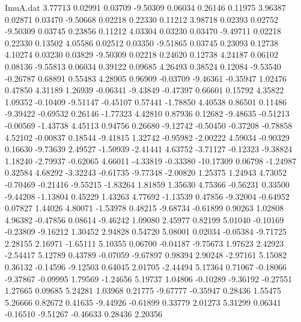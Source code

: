 \begin{filecontents}{ImuA.dat}
   3.77713    0.02991    0.03709   -9.50309    0.06034    0.26146    0.11975
   3.96387    0.02871    0.03470   -9.50668    0.02218    0.22330    0.11212
   3.98718    0.02393    0.02752   -9.50309    0.03745    0.23856    0.11212
   4.03304    0.03230    0.03470   -9.49711    0.02218    0.22330    0.13502
   4.05586    0.02512    0.03350   -9.51865    0.03745    0.23093    0.12738
   4.10274    0.03230    0.03829   -9.50309    0.02218    0.24620    0.12738
   4.24187    0.06102    0.08136   -9.55813    0.06034    0.39122    0.09685
   4.26493    0.38524    0.12084   -9.53540   -0.26787    0.68891    0.55483
   4.28905    0.96909   -0.03709   -9.46361   -0.35947    1.02476    0.47850
   4.31189    1.26939   -0.06341   -9.43849   -0.47397    0.66601    0.15792
   4.35822    1.09352   -0.10409   -9.51147   -0.45107    0.57441   -1.78850
   4.40538    0.86501    0.11486   -9.39422   -0.69532    0.26146   -1.77323
   4.42810    0.87936    0.12682   -9.48635   -0.51213   -0.00569   -1.43738
   4.45113    0.94756    0.26680   -9.12742   -0.50450   -0.37208   -0.78858
   4.52102   -0.00837    0.18544   -9.41815    1.32742   -0.95982   -2.00222
   4.59034   -0.90329    0.16630   -9.73639    2.49527   -1.50939   -2.41441
   4.63752   -3.71127   -0.12323   -9.38824    1.18240   -2.79937   -0.62065
   4.66011   -4.33819   -0.33380  -10.17309    0.06798   -1.24987    0.32584
   4.68292   -3.32243   -0.61735   -9.77348   -2.00820    1.25375    1.24943
   4.73052   -0.70469   -0.21416   -9.55215   -1.83264    1.81859    1.35630
   4.75366   -0.56231    0.33500   -9.44208   -1.13804    0.45229    1.43263
   4.77692   -1.13539    0.47856   -9.32004   -0.64952    0.07827    1.44026
   4.80071   -1.53978    0.48215   -9.68734   -0.61899    0.90263    1.02808
   4.96382   -0.47856    0.08614   -9.46242    1.09080    2.45977    0.82199
   5.01040   -0.10169   -0.23809   -9.16212    1.30452    2.94828    0.54720
   5.08001    0.02034   -0.05384   -9.71725    2.28155    2.16971   -1.65111
   5.10355    0.06700   -0.04187   -9.75673    1.97623    2.42923   -2.54417
   5.12789    0.43789   -0.07059   -9.67897    0.98394    2.90248   -2.97161
   5.15082    0.36132   -0.14596   -9.12503    0.64045    2.01705   -2.44494
   5.17364    0.71067   -0.18066   -9.37867   -0.09995    1.79569   -1.24656
   5.19737    1.04806   -0.10289   -9.36192   -0.27551    1.27665    0.09685
   5.24281    1.03968    0.21775   -9.67777   -0.35947    0.28436    1.55475
   5.26666    0.82672    0.41635   -9.44926   -0.61899    0.33779    2.01273
   5.31299    0.06341   -0.16510   -9.51267   -0.46633    0.28436    2.20356

\end{filecontents}
